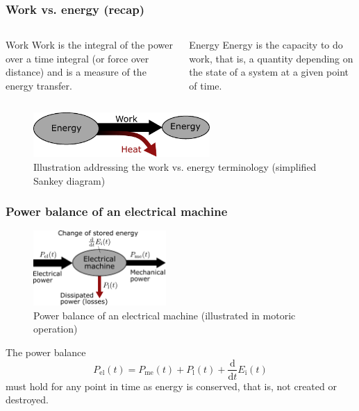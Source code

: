 \begin{frame}
	\frametitle{Work vs. energy (recap)}
	\begin{columns}
		\begin{column}{0.5\textwidth}
			\begin{varblock}{Work}
				Work is the integral of the power over a time integral (or force over distance) and is a measure of the energy transfer.
			\end{varblock}
		\end{column}
		\begin{column}{0.5\textwidth}
			\begin{varblock}{Energy}
				Energy is the capacity to do work, that is, a quantity depending on the state of a system at a given point of time.				
			\end{varblock}
		\end{column}
		\end{columns}
		\vspace{0.5cm}
		\begin{figure}
			\centering
			\includegraphics[width=0.6\textwidth]{fig/lec01/Work_Energy.pdf}
			\caption{Illustration addressing the work vs. energy terminology (simplified Sankey diagram)}
			\label{fig:work_vs_energy}
		\end{figure}
\end{frame}

\begin{frame}
	\frametitle{Power balance of an electrical machine}
	\begin{figure}
		\centering
		\includegraphics[width=0.45\textwidth]{fig/lec01/Power_balance_machine.pdf}
		\caption{Power balance of an electrical machine (illustrated in motoric operation)}
		\label{fig:power_balance_machine}
	\end{figure}
	The power balance
	\begin{equation}
		P_\mathrm{el}(t) = P_\mathrm{me}(t) + P_\mathrm{l}(t) + \frac{\mathrm{d}}{\mathrm{d}t}E_\mathrm{i}(t)
	\end{equation}
	must hold for any point in time as energy is conserved, that is, not created or destroyed.
\end{frame}

